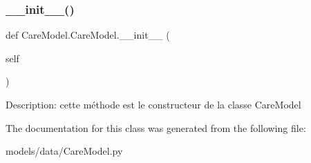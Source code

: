 \subsubsection{\texorpdfstring{\+\_\+\+\_\+init\+\_\+\+\_\+()}{\_\_init\_\_()}}
{\footnotesize\ttfamily def Care\+Model.\+Care\+Model.\+\_\+\+\_\+init\+\_\+\+\_\+ (\begin{DoxyParamCaption}\item[{}]{self }\end{DoxyParamCaption})}

\begin{DoxyVerb}Description: cette méthode est le constructeur de la classe CareModel
\end{DoxyVerb}
 

The documentation for this class was generated from the following file\+:\begin{DoxyCompactItemize}
\item 
models/data/Care\+Model.\+py\end{DoxyCompactItemize}
